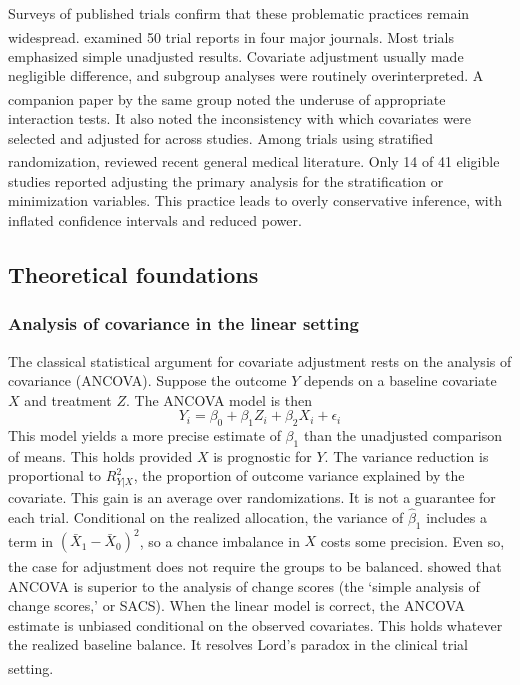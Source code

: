 \documentclass[
  11pt,
]{article}
\begin{document}
Surveys of published trials confirm that these
problematic practices remain widespread.\textsuperscript{} examined 50 trial reports
in four major journals. Most trials emphasized simple
unadjusted results. Covariate adjustment usually made
negligible difference, and subgroup analyses were
routinely overinterpreted. A companion paper by the
same group\textsuperscript{} noted
the underuse of appropriate interaction tests. It also
noted the inconsistency with which covariates were
selected and adjusted for across studies. Among trials
using stratified randomization,\textsuperscript{}
reviewed recent general medical literature. Only 14 of
41 eligible studies reported adjusting the primary
analysis for the stratification or minimization
variables. This practice leads to
overly conservative inference, with inflated confidence
intervals and reduced power.

\subsection{Theoretical foundations}\label{theoretical-foundations}

\subsubsection{Analysis of covariance in the linear setting}\label{analysis-of-covariance-in-the-linear-setting}

The classical statistical argument for covariate
adjustment rests on the analysis of covariance (ANCOVA).
Suppose the outcome \(Y\) depends on a baseline covariate
\(X\) and treatment \(Z\). The ANCOVA model is then
\[Y_i = \beta_0 + \beta_1 Z_i + \beta_2 X_i + \epsilon_i\]
This model yields a more precise estimate of \(\beta_1\)
than the unadjusted comparison of means. This holds
provided \(X\) is prognostic for \(Y\). The variance
reduction is proportional to \(R^2_{Y|X}\), the
proportion of outcome variance explained by the
covariate. This gain is an average over randomizations.
It is not a guarantee for each trial. Conditional on the
realized allocation, the variance of \(\hat{\beta}_1\)
includes a term in \((\bar{X}_1 - \bar{X}_0)^2\), so a
chance imbalance in \(X\) costs some precision. Even so,
the case for adjustment does not require the groups to
be balanced\textsuperscript{}.\textsuperscript{} showed that ANCOVA is superior
to the analysis of change scores (the `simple analysis
of change scores,' or SACS). When the linear model is
correct, the ANCOVA estimate is unbiased conditional on
the observed covariates. This holds whatever the
realized baseline balance. It resolves Lord's paradox in
the clinical trial setting\textsuperscript{}.
\end{document}
